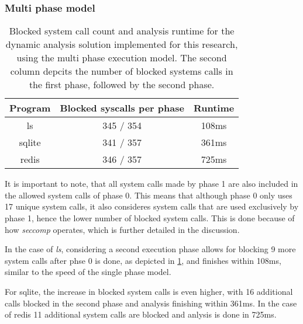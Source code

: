 \subsubsection {Multi phase model}
\begin{table}[!h]
\begin{center}
\caption{Blocked system call count and analysis runtime for the dynamic analysis solution implemented for this research, using the multi phase execution model. The second column depcits the number of blocked systems calls in the first phase, followed by the second phase.}
\label{tbl:dyn_mp_results}
\begin{tabular}{||c c c||}
 \hline
Program & Blocked syscalls per phase & Runtime \\
 \hline\hline
 ls & 345 / 354 & 108ms \\
 \hline
 sqlite & 341 / 357 & 361ms \\
 \hline
 redis & 346 / 357 & 725ms \\
 \hline
\end{tabular}
\end{center}
\end{table}
It is important to note, that all system calls made by phase 1 are also included in the allowed system calls of phase 0. This means that although phase 0 only uses 17 unique system calls, it also consideres system calls that are used exclusively by phase 1, hence the lower number of blocked system calls.
This is done because of how \textit{seccomp} operates, which is further detailed in the discussion.

In the case of \textit{ls}, considering a second execution phase allows for blocking 9 more system calls after phse 0 is done, as depicted in \ref{tbl:dyn_mp_results}, and finishes within 108ms, similar to the speed of the single phase model.

For sqlite, the increase in blocked system calls is even higher, with 16 additional calls blocked in the second phase and analysis finishing within 361ms.
In the case of redis 11 additional system calls are blocked and anlysis is done in 725ms.

